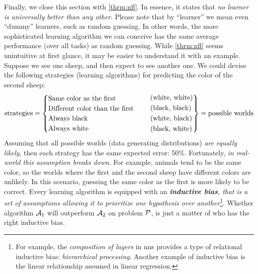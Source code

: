 Finally, we close this section with \Theorem{} \ref{thrm:nfl}. In essence, it
states that \emph{no learner is universally better than any
other}. Please note that by ``learner'' we mean even ``dummy'' learners, such as
random guessing. In other words, the more sophisticated
learning algorithm we can conceive has the same average performance (over all
tasks) as random guessing. While \Theorem{} \ref{thrm:nfl} seems unintuitive at
first glance, it may be easier to understand it with an example. Suppose we see
one sheep, and then expect to see another one.  We could devise the following
strategies (learning algorithms) for predicting the color of the second sheep:
\begin{equation}
	\label{eq:nfl}
	\text{strategies} = 
	\begin{cases}
		\text{Same color as the first} \\
		\text{Different color than the first} \\
		\text{Always black} \\
		\text{Always white} \\
	\end{cases}
	\quad
	\begin{rcases}
		\text{(white, white)} \\
		\text{(black, black)} \\
		\text{(white, black)} \\
		\text{(black, white)} \\
	\end{rcases}
	= \text{possible worlds}
\end{equation}
Assuming that all possible worlds (data generating distributions) \emph{are
equally likely}, then each strategy has the same expected error: 50\%.
Fortunately, \emph{in real-world this assumption breaks down}. For example,
animals tend to be the same color, so the worlds where the first and the second
sheep have different colors are unlikely. In this scenario, guessing the same
color as the first is more likely to be correct. Every learning algorithm is
equipped with an \emph{\textbf{inductive bias}, that is a set of assumptions allowing it to prioritize one hypothesis
over another}\footnote{For example, the \emph{composition of layers} in
\glspl{nn} provides a type of relational inductive bias: \emph{hierarchical
processing}. Another example of inductive bias is the linear relationship
assumed in linear regression.}. Whether algorithm
$\mathcal{A}_1$ will outperform $\mathcal{A}_2$ on problem $\mathcal{P}$, is just a matter
of who has the right inductive bias.

